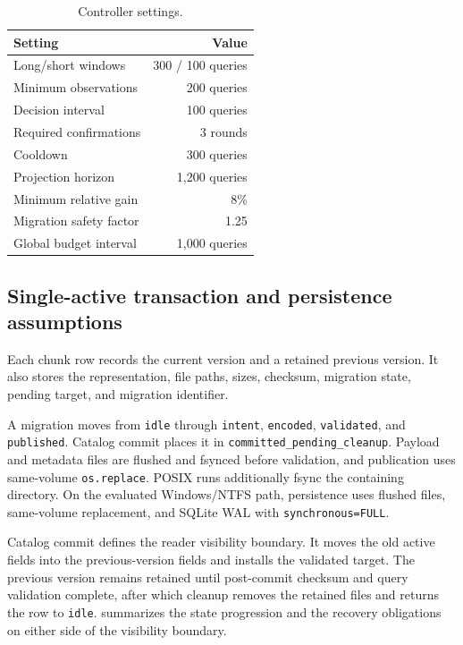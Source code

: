 \documentclass[final,5p,times,twocolumn,authoryear]{elsarticle}
\begin{document}
\begin{table}[t]
\centering
\caption{Controller settings.}
\label{tab:parameters}
\begin{tabular}{@{}lr@{}}
\toprule
Setting & Value \\
\midrule
Long/short windows & 300 / 100 queries \\
Minimum observations & 200 queries \\
Decision interval & 100 queries \\
Required confirmations & 3 rounds \\
Cooldown & 300 queries \\
Projection horizon & 1,200 queries \\
Minimum relative gain & 8\% \\
Migration safety factor & 1.25 \\
Global budget interval & 1,000 queries \\
\bottomrule
\end{tabular}
\end{table}

\subsection{Single-active transaction and persistence assumptions}

Each chunk row records the current version and a retained previous version. It also stores the representation, file paths, sizes, checksum, migration state, pending target, and migration identifier.

A migration moves from \texttt{idle} through \texttt{intent}, \texttt{encoded}, \texttt{validated}, and \texttt{published}. Catalog commit places it in \texttt{committed\_pending\_cleanup}. Payload and metadata files are flushed and fsynced before validation, and publication uses same-volume \texttt{os.replace}. POSIX runs additionally fsync the containing directory. On the evaluated Windows/NTFS path, persistence uses flushed files, same-volume replacement, and SQLite WAL with \texttt{synchronous=FULL}.

Catalog commit defines the reader visibility boundary. It moves the old active fields into the previous-version fields and installs the validated target. The previous version remains retained until post-commit checksum and query validation complete, after which cleanup removes the retained files and returns the row to \texttt{idle}.  summarizes the state progression and the recovery obligations on either side of the visibility boundary.
\end{document}
